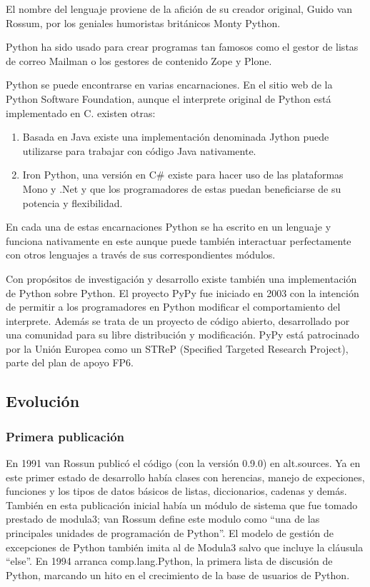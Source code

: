 \documentclass[a4paper,spanish,12pt]{book}
\begin{document}
El nombre del lenguaje proviene de la afición de su creador original, Guido van Rossum, por los geniales humoristas británicos Monty Python.

Python ha sido usado para crear programas tan famosos como el gestor de listas de correo Mailman o los gestores de contenido Zope y Plone.

Python se puede encontrarse en varias encarnaciones. En el sitio web de la Python Software Foundation, aunque el interprete original de Python está implementado en C. existen otras:
\begin{enumerate}
	\item Basada en Java existe una implementación denominada Jython puede utilizarse para trabajar con código Java nativamente. 
	\item Iron Python, una versión en C\# existe para hacer uso de las plataformas Mono y .Net y que los programadores de estas puedan beneficiarse de su potencia y flexibilidad. 
\end{enumerate}
En cada una de estas encarnaciones Python se ha escrito en un lenguaje y funciona nativamente en este aunque puede también interactuar perfectamente con otros lenguajes a trav\'es de sus correspondientes módulos.

Con propósitos de investigación y desarrollo existe tambi\'en una implementación de Python sobre Python. El proyecto PyPy fue iniciado en 2003 con la intención de permitir a los programadores en Python modificar el comportamiento del interprete. Además se trata de un proyecto de código abierto, desarrollado por una comunidad para su libre distribución y modificación. PyPy está patrocinado por la Unión Europea como un STReP (Specified Targeted Research Project), parte del plan de apoyo FP6.

\subsection{Evolución}

\subsubsection{Primera publicación}

En 1991 van Rossun publicó el código (con la versión 0.9.0) en alt.sources. Ya en este primer estado de desarrollo había clases con herencias, manejo de expeciones, funciones y los tipos de datos básicos de listas, diccionarios, cadenas y demás. Tambi\'en en esta publicación inicial había un módulo de sistema que fue tomado prestado de modula3; van Rossum define este modulo como ``una de las principales unidades de programación de Python''. El modelo de gestión de excepciones de Python tambi\'en imita al de Modula3 salvo que incluye la cláusula ``else''. En 1994 arranca comp.lang.Python, la primera lista de discusión de Python, marcando un hito en el crecimiento de la base de usuarios de Python.
\end{document}
